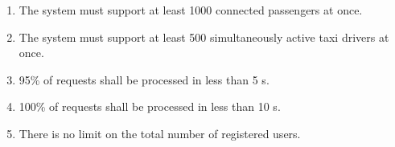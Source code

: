 \begin{enumerate}
    \item The system must support at least 1000 connected passengers at once.
    \item The system must support at least 500 simultaneously active taxi drivers at once.
    \item 95\% of requests shall be processed in less than 5 s.
    \item 100\% of requests shall be processed in less than 10 s.
    \item There is no limit on the total number of registered users.
\end{enumerate}
